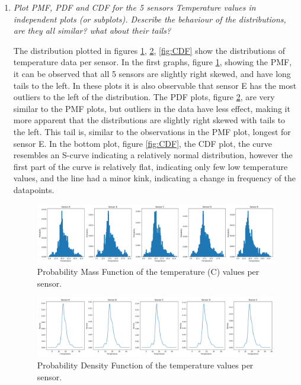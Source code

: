 \documentclass[a4paper,12pt]{article} %
\begin{document}
\begin{enumerate}
\item {\it Plot PMF, PDF and CDF for the 5 sensors Temperature values in independent plots (or subplots). Describe the behaviour of the distributions, are they all similar? what about their tails?}

The distribution plotted in figures \ref{fig:PMF}, \ref{fig:PDF}, \ref{fig:CDF} show the distributions of temperature data per sensor. In the first graphs, figure \ref{fig:PMF}, showing the PMF, it can be observed that all 5 sensors are slightly right skewed, and have long tails to the left. In these plots it is also observable that sensor E has the most outliers to the left of the distribution. The PDF plots, figure \ref{fig:PDF}, are very similar to the PMF plots, but outliers in the data have less effect, making it more apparent that the distributions are slightly right skewed with tails to the left. This tail is, similar to the observations in the PMF plot, longest for sensor E. In the bottom plot, figure \ref{fig:CDF}, the CDF plot, the curve resembles an S-curve indicating a relatively normal distribution, however the first part of the curve is relatively flat, indicating only few low temperature values, and the line had a minor kink, indicating a change in frequency of the datapoints. 

 \begin{figure}[H] 
	\centering
	\includegraphics[width=1\textwidth]{PMF of temperature per sensor.png} 
	\caption{Probability Mass Function of the temperature (\degree C) values per sensor.} %
	\label{fig:PMF}
\end{figure} 

 \begin{figure}[H] 
	\centering
	\includegraphics[width=1\textwidth]{PDF of temperature per sensor.png} 
	\caption{Probability Density Function of the temperature values per sensor.} %
	\label{fig:PDF}
\end{figure} 


\end{enumerate}
\end{document}
